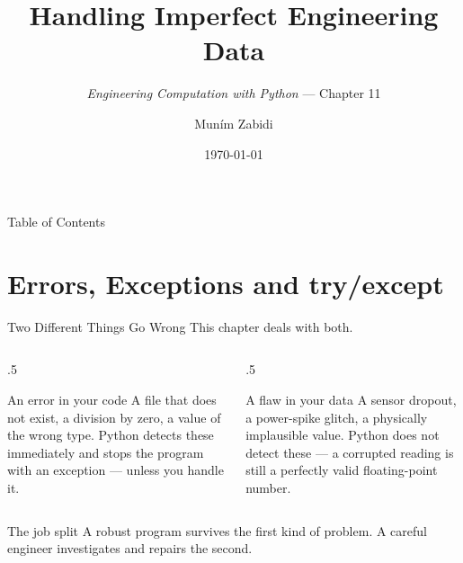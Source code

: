 \documentclass[9pt,aspectratio=169,xcolor=table]{beamer}
\title{Handling Imperfect Engineering Data}
\subtitle{\emph{Engineering Computation with Python} --- Chapter 11}
\author{Mun\'{i}m Zabidi}
\institute{\color{primary}Faculty of Electrical Engineering, Universiti Teknologi Malaysia}
\date{\today}
\begin{document}
\titlepage

\begin{frame}{Table of Contents}
    \tableofcontents
\end{frame}

\section{Errors, Exceptions and try/except}

\begin{frame}{Two Different Things Go Wrong}
    \leavevmode
    This chapter deals with both.

    \vspace{2mm}
    \begin{columns}[t]
        \begin{column}{.5\textwidth}
            \begin{block}{An error in your \alert{code}}
                \small A file that does not exist, a division by zero, a
                value of the wrong type. Python detects these
                \alert{immediately} and stops the program with an
                exception --- unless you handle it.
            \end{block}
        \end{column}
        \begin{column}{.5\textwidth}
            \begin{alertblock}{A flaw in your \alert{data}}
                \small A sensor dropout, a power-spike glitch, a
                physically implausible value. Python does \alert{not}
                detect these --- a corrupted reading is still a
                perfectly valid floating-point number.
            \end{alertblock}
        \end{column}
    \end{columns}

    \vspace{3mm}
    \begin{block}{The job split}
        A robust program \alert{survives} the first kind of problem. A
        careful engineer \alert{investigates and repairs} the second.
    \end{block}
\end{frame}
\end{document}
